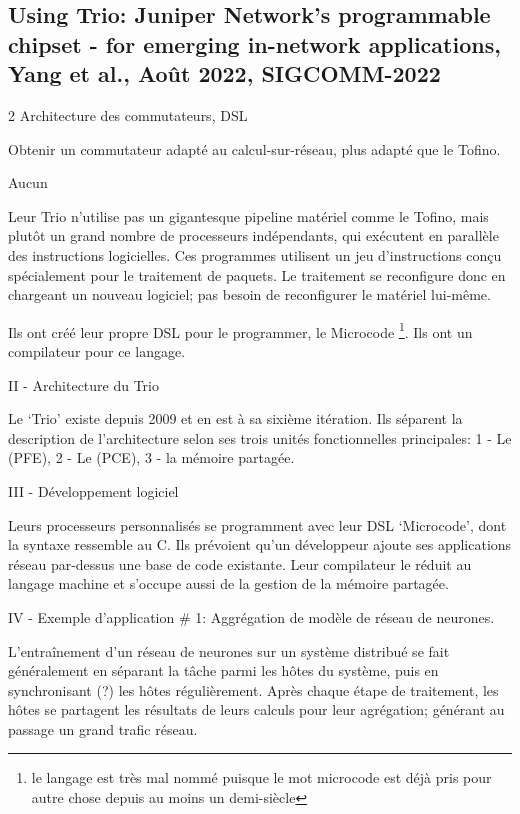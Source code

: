 
\subsection{Using Trio: Juniper Network's programmable chipset - for emerging in-network applications, Yang et al., Août 2022, SIGCOMM-2022}
 2
 Architecture des commutateurs, DSL

 Obtenir un commutateur adapté au calcul-sur-réseau, plus adapté que le Tofino.

 Aucun

 Leur  \og Trio \fg n'utilise pas un gigantesque pipeline matériel comme le Tofino, mais plutôt un grand nombre de processeurs indépendants, qui exécutent en parallèle des instructions logicielles. Ces programmes utilisent un jeu d'instructions conçu spécialement pour le traitement de paquets. Le traitement se reconfigure donc en chargeant un nouveau logiciel; pas besoin de reconfigurer le matériel lui-même.

Ils ont créé leur propre DSL pour le programmer, le \og Microcode \fg \footnote{le langage est très mal nommé puisque le mot \og microcode \fg est déjà pris pour autre chose depuis au moins un demi-siècle}. Ils ont un compilateur pour ce langage.

II - Architecture du Trio

Le  `Trio' existe depuis 2009 et en est à sa sixième itération. Ils séparent la description de l'architecture selon ses trois unités fonctionnelles principales: 1 - Le  (PFE), 2 - Le  (PCE), 3 - la mémoire partagée.

III - Développement logiciel

Leurs processeurs personnalisés se programment avec leur DSL `Microcode', dont la syntaxe ressemble au C. Ils prévoient qu'un développeur ajoute ses applications réseau par-dessus une base de code existante. Leur compilateur le réduit au langage machine et s'occupe aussi de la gestion de la mémoire partagée.

IV - Exemple d'application \# 1: Aggrégation de modèle de réseau de neurones.

L'entraînement d'un réseau de neurones sur un système distribué se fait généralement en séparant la tâche parmi les hôtes du système, puis en synchronisant (?) les hôtes régulièrement. Après chaque étape de traitement, les hôtes se partagent les résultats de leurs calculs pour leur agrégation; générant au passage un grand trafic réseau.

